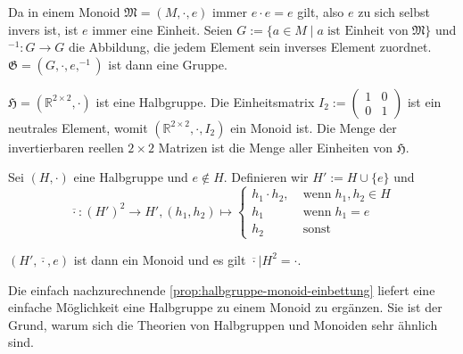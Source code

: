 \begin{remark}
    Da in einem Monoid $\mathfrak{M} = (M, \cdot, e)$ immer $e \cdot e = e$ gilt, also $e$ zu sich selbst invers ist, ist $e$ immer eine Einheit. Seien $G := \{a \in M \mid a \;\text{ist Einheit von}\; \mathfrak{M}\}$ und $^{-1}: G \to G$ die Abbildung, die jedem Element sein inverses Element zuordnet. $\mathfrak{G} = (G, \cdot, e, ^{-1})$ ist dann eine Gruppe.
\end{remark}

\begin{example}
    $\mathfrak{H} = (\mathbb{R}^{2\times 2}, \cdot)$ ist eine Halbgruppe. Die Einheitsmatrix $I_2 := \left(\begin{matrix}
        1 & 0 \\ 0 & 1
    \end{matrix}\right)$ ist ein neutrales Element, womit $(\mathbb{R}^{2\times 2}, \cdot, I_2)$ ein Monoid ist. Die Menge der invertierbaren reellen $2 \times 2$ Matrizen ist die Menge aller Einheiten von $\mathfrak{H}$.
\end{example}

\begin{proposition}\label{prop:halbgruppe-monoid-einbettung}
    Sei $(H, \cdot)$ eine Halbgruppe und $e \not\in H$. Definieren wir $H' := H \cup \{e\}$ und $$\overline{\cdot}: (H')^2 \to H', (h_1, h_2) \mapsto \left\{\begin{array}{ll}
        h_1 \cdot h_2, & \;\text{wenn}\; h_1, h_2 \in H \\
        h_1 & \;\text{wenn}\; h_1 = e \\
        h_2 & \;\text{sonst}
    \end{array}\right.$$

    $(H', \overline{\cdot}, e)$ ist dann ein Monoid und es gilt $\overline{\cdot}\vert{H^2} = \cdot$.
\end{proposition}

\begin{remark}
    Die einfach nachzurechnende \cref{prop:halbgruppe-monoid-einbettung} liefert eine einfache Möglichkeit eine Halbgruppe zu einem Monoid zu ergänzen. Sie ist der Grund, warum sich die Theorien von Halbgruppen und Monoiden sehr ähnlich sind.
\end{remark}


